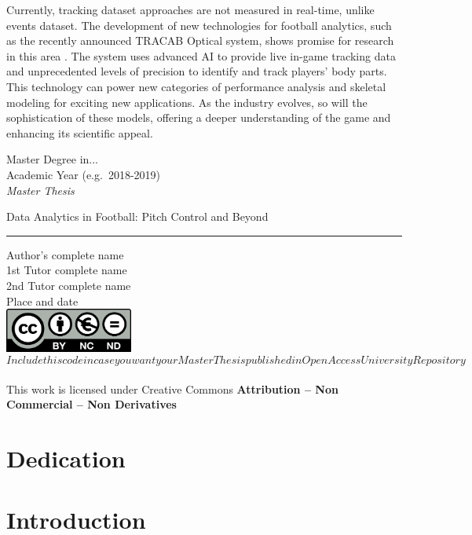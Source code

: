 \documentclass[twoside,nohyper]{tufte-book}
\begin{document}
Currently, tracking dataset approaches are not measured in real-time,
unlike events dataset. The development of new technologies for football
analytics, such as the recently announced TRACAB Optical system, shows
promise for research in this area \citep{TRACAB}. The system uses advanced AI
to provide live in-game tracking data and unprecedented levels of
precision to identify and track players' body parts. This technology can
power new categories of performance analysis and skeletal modeling for
exciting new applications. As the industry evolves, so will the
sophistication of these models, offering a deeper understanding of the
game and enhancing its scientific appeal.

Master Degree in...\\
Academic Year (e.g.~2018-2019)\\
\emph{Master Thesis}

Data Analytics in Football: Pitch Control and Beyond\\

\begin{center}\rule{0.5\linewidth}{0.5pt}\end{center}

\hfill\break
Author's complete name\\

1st Tutor complete name\\
2nd Tutor complete name\\
Place and date\\

\hfill\break
\includegraphics[width=4.2cm,height=\textheight]{imagenes/creativecommons.png}\\
\emph{\[Include this code in case you want your Master Thesis published in
Open Access University Repository\]}\\
This work is licensed under Creative Commons \textbf{Attribution -- Non
Commercial -- Non Derivatives}

\hypertarget{dedication}{%
\chapter*{Dedication}\label{dedication}}

\hypertarget{introduction-1}{%
\chapter{Introduction}\label{introduction-1}}
\end{document}
